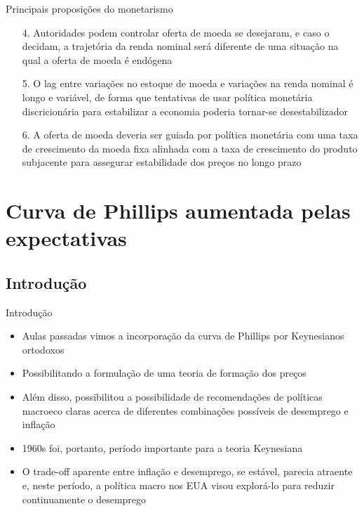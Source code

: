 \documentclass[10pt]{beamer}
\begin{document}
\begin{frame}{Principais proposições do monetarismo}
    \begin{enumerate}        
        \item[4.] Autoridades podem controlar oferta de moeda se desejaram, e caso o decidam, a trajetória da renda nominal será diferente de uma situação na qual a oferta de moeda é endógena
        \bigskip
        \item[5.] O lag entre variações no estoque de moeda e variações na renda nominal é longo e variável, de forma que tentativas de usar política monetária discricionária para estabilizar a economia poderia tornar-se desestabilizador
        \bigskip
        \item[6.] A oferta de moeda deveria ser guiada por política monetária com uma taxa de crescimento da moeda fixa alinhada com a taxa de crescimento do produto subjacente para assegurar estabilidade dos preços no longo prazo
    \end{enumerate}
\end{frame}

\section{Curva de Phillips aumentada pelas expectativas}
\subsection{Introdução}
\begin{frame}{Introdução}
    \begin{itemize}
        \item Aulas passadas vimos a incorporação da curva de Phillips por Keynesianos ortodoxos
        \bigskip
        \item Possibilitando a formulação de uma teoria de formação dos preços
        \bigskip
        \item Além disso, possibilitou a possibilidade de recomendações de políticas macroeco claras acerca de diferentes combinações possíveis de desemprego e inflação
        \bigskip
        \item 1960s foi, portanto, período importante para a teoria Keynesiana
        \bigskip
        \item O trade-off aparente entre inflação e desemprego, se estável, parecia atraente e, neste período, a política macro nos EUA visou explorá-lo para reduzir continuamente o desemprego
    \end{itemize}
\end{frame}
\end{document}
